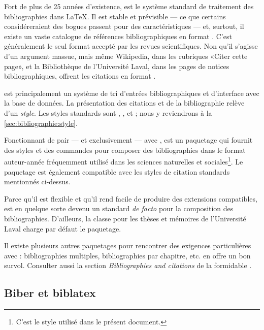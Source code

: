 Fort de plus de 25 années d'existence, {\BibTeX}
\citep{bibtex} est le système standard de traitement des
bibliographies dans {\LaTeX}. Il est stable et prévisible --- ce que
certains considéreraient des bogues passent pour des caractéristiques
--- et, surtout, il existe un vaste catalogue de références
bibliographiques en format {\BibTeX}. C'est généralement le seul
format accepté par les revues scientifiques. Non qu'il s'agisse d'un
argument massue, mais même Wikipedia, dans les rubriques «Citer cette
page», et la Bibliothèque de l'Université Laval, dans les pages de
notices bibliographiques, offrent les citations en format {\BibTeX}.

{\BibTeX} est principalement un système de tri d'entrées
bibliographiques et d'interface avec la base de données. La
présentation des citations et de la bibliographie relève d'un
\emph{style}. Les styles standards sont , ,
 et ; nous y reviendrons à la
\autoref{sec:bibliographie:style}.

Fonctionnant de pair --- et exclusivement --- avec {\BibTeX},
 \citep{natbib} est un paquetage qui fournit des styles et
des commandes pour composer des bibliographies dans le format
auteur-année fréquemment utilisé dans les sciences naturelles et
sociales\footnote{%
  C'est le style utilisé dans le présent document.}. %
Le paquetage est également compatible avec les styles de citation
standards mentionnés ci-dessus.

Parce qu'il est flexible et qu'il rend facile de produire des
extensions compatibles,  est en quelque sorte devenu un
standard \emph{de facto} pour la composition des bibliographies.
D'ailleurs, la classe  pour les thèses et mémoires de
l'Université Laval charge par défaut le paquetage.

Il existe plusieurs autres paquetages pour rencontrer des exigences
particulières avec {\BibTeX}: bibliographies multiples, bibliographies
par chapitre, etc. \citet{Mori:bibliographies:2009} en offre un bon
survol. Consulter aussi la section \emph{Bibliographies and citations}
de la formidable %
.


\subsection{Biber et biblatex}
\label{sec:bibliographie:systeme:biblatex}

